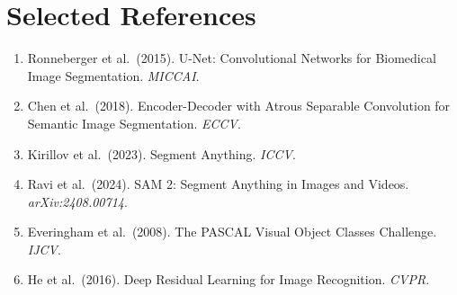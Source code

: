 \documentclass[11pt,a4paper]{article}
\begin{document}
\section{Selected References}

\begin{enumerate}
  \item Ronneberger et al.\ (2015). U-Net: Convolutional Networks for Biomedical Image Segmentation. \textit{MICCAI}.
  \item Chen et al.\ (2018). Encoder-Decoder with Atrous Separable Convolution for Semantic Image Segmentation. \textit{ECCV}.
  \item Kirillov et al.\ (2023). Segment Anything. \textit{ICCV}.
  \item Ravi et al.\ (2024). SAM 2: Segment Anything in Images and Videos. \textit{arXiv:2408.00714}.
  \item Everingham et al.\ (2008). The PASCAL Visual Object Classes Challenge. \textit{IJCV}.
  \item He et al.\ (2016). Deep Residual Learning for Image Recognition. \textit{CVPR}.
\end{enumerate}
\end{document}
